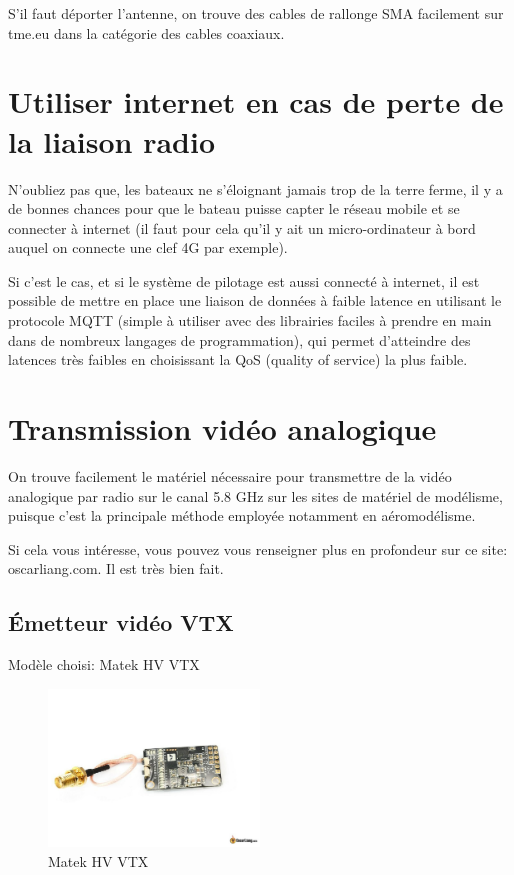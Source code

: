 \documentclass[a4paper, 11pt]{report}
\begin{document}
S'il faut déporter l'antenne, on trouve des cables de rallonge SMA
facilement sur tme.eu dans la catégorie des cables coaxiaux.

\section{Utiliser internet en cas de perte de la liaison radio}

N'oubliez pas que, les bateaux ne s'éloignant jamais trop de la terre
ferme, il y a de bonnes chances pour que le bateau puisse capter le
réseau mobile et se connecter à internet (il faut pour cela qu'il
y ait un micro-ordinateur à bord auquel on connecte une clef 4G par
exemple).

Si c'est le cas, et si le système de pilotage est aussi connecté à
internet, il est possible de mettre en place une liaison de données
à faible latence en utilisant le protocole MQTT (simple à utiliser
avec des librairies faciles à prendre en main dans de nombreux langages
de programmation), qui permet d'atteindre des latences très faibles
en choisissant la QoS (quality of service) la plus faible.

\section{Transmission vidéo analogique}
On trouve facilement le matériel nécessaire pour transmettre de la
vidéo analogique par radio sur le canal 5.8 GHz sur les sites de matériel
de modélisme, puisque c'est la principale méthode employée notamment
en aéromodélisme.

Si cela vous intéresse, vous pouvez vous renseigner plus en profondeur sur ce site: oscarliang.com. Il est très bien fait.

\subsection{Émetteur vidéo VTX}
Modèle choisi: Matek HV VTX

\begin{figure}[h]
	\begin{center}
		\includegraphics[width=0.5\textwidth]{images/vtx.jpg}
		\caption{Matek HV VTX}
	\end{center}
\end{figure}
\end{document}
